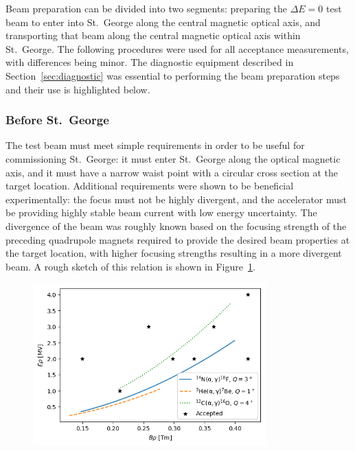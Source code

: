 Beam preparation can be divided into two segments: preparing the $\Delta E = 0$
test beam to enter into St.\ George along the central
magnetic optical axis, and transporting that beam along the central magnetic
optical axis within St.\ George. The following procedures were used for all
acceptance measurements, with differences being minor. The diagnostic equipment
described in Section~\ref{sec:diagnostic} was essential to performing the beam
preparation steps and their use is highlighted below.

\subsubsection{Before St.\ George}

The test beam must meet simple requirements in order to be useful for
commissioning St.\ George: it must enter St.\ George along the optical magnetic
axis, and it must have a narrow waist point with a circular cross section at
the target location. Additional requirements
were shown to be beneficial experimentally: the focus must not be highly
divergent, and the accelerator
must be providing highly stable beam current with low energy uncertainty. The
divergence of the beam was roughly known based on the focusing strength of the
preceding quadrupole magnets required to provide the desired beam properties
at the target location, with higher focusing strengths resulting in a more
divergent beam. A rough sketch of this relation is shown in
Figure~\ref{fig:divergence}.

\begin{figure}[t]
   \begin{center}
       \centerline{\includegraphics[width=0.8\textwidth]
           {figures/rigidity_phase_space.png}}
       \caption[Sketch of beam divergence due to focusing strength]{}
       \label{fig:divergence}
   \end{center}
\end{figure}

